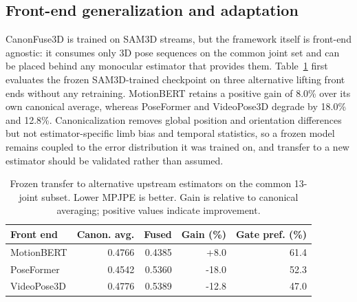 \documentclass[preprint,12pt]{elsarticle}
\begin{document}
\FloatBarrier
\subsection{Front-end generalization and adaptation}

CanonFuse3D is trained on SAM3D streams, but the framework itself is front-end agnostic: it consumes only 3D pose sequences on the common joint set and can be placed behind any monocular estimator that provides them. Table~\ref{tab:frontend_generalization} first evaluates the frozen SAM3D-trained checkpoint on three alternative lifting front ends without any retraining. MotionBERT retains a positive gain of 8.0\% over its own canonical average, whereas PoseFormer and VideoPose3D degrade by 18.0\% and 12.8\%. Canonicalization removes global position and orientation differences but not estimator-specific limb bias and temporal statistics, so a frozen model remains coupled to the error distribution it was trained on, and transfer to a new estimator should be validated rather than assumed.

\begin{table}[t]
\centering
\caption{Frozen transfer to alternative upstream estimators on the common 13-joint subset. Lower MPJPE is better. Gain is relative to canonical averaging; positive values indicate improvement.}
\label{tab:frontend_generalization}
\small
\setlength{\tabcolsep}{4pt}
\begin{tabular}{lrrrr}
\toprule
Front end & Canon. avg. & Fused & Gain (\%) & Gate pref. (\%) \\
\midrule
MotionBERT & 0.4766 & 0.4385 & +8.0 & 61.4 \\
PoseFormer & 0.4542 & 0.5360 & -18.0 & 52.3 \\
VideoPose3D & 0.4776 & 0.5389 & -12.8 & 47.0 \\
\bottomrule
\end{tabular}
\end{table}

\end{document}
